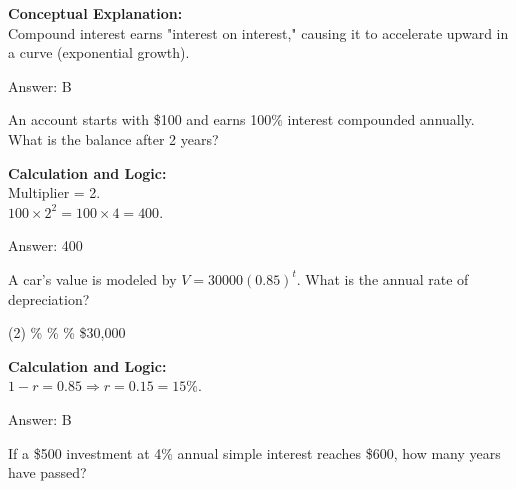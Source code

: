 \documentclass[11pt,paper=a4,answers]{exam}
\begin{document}
\begin{questions}
\begin{solution}
\textbf{Conceptual Explanation:} \\
Compound interest earns "interest on interest," causing it to accelerate upward in a curve (exponential growth).

\vspace{30pt}

Answer: \colorbox{yellow!100}{B}
\end{solution}

\vspace{60pt}

\question
An account starts with \$100 and earns 100\% interest compounded annually. What is the balance after 2 years?

\begin{solution}
\textbf{Calculation and Logic:} \\
Multiplier = 2. \\
$100 \times 2^2 = 100 \times 4 = 400$.

\vspace{30pt}

Answer: \colorbox{yellow!100}{400}
\end{solution}

\vspace{60pt}

\question
A car's value is modeled by $V = 30000(0.85)^t$. What is the annual rate of depreciation?
\begin{tasks}(2)
    \%
    \%
    \%
    \task \$30,000
\end{tasks}

\begin{solution}
\textbf{Calculation and Logic:} \\
$1 - r = 0.85 \Rightarrow r = 0.15 = 15\%$.

\vspace{30pt}

Answer: \colorbox{yellow!100}{B}
\end{solution}

\vspace{60pt}

\question
If a \$500 investment at 4\% annual simple interest reaches \$600, how many years have passed?


\end{questions}
\end{document}
